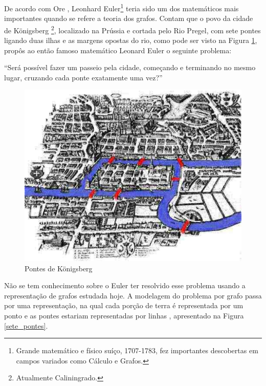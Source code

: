 De acordo com Ore \cite{Ore:1963}, Leonhard Euler\footnote{Grande matemático e físico suíço, 1707-1783, fez importantes descobertas em campos variados como Cálculo e Grafos.} teria sido um dos matemáticos mais importantes quando se refere a teoria dos grafos. Contam que o povo da cidade de Königsberg \footnote{Atualmente Caliningrado.}, localizado na Prússia e cortada pelo Rio Pregel, com sete pontes ligando duas ilhas e as margens opostas do rio, como pode ser visto na Figura \ref{Konigsberg}, propôs ao então famoso matemático Leonard Euler o seguinte problema:

	``Será possível fazer um passeio pela cidade, começando e
	terminando no mesmo lugar, cruzando cada ponte exatamente uma vez?''

\begin{figure}[!h]
	\centering
	\includegraphics[scale=0.35]{figuras/capitulo2/Konigsberg.eps}
	\caption[Pontes de Königsberg]{Pontes de Königsberg\footnotemark}
	\label{Konigsberg}
\end{figure}

Não se tem conhecimento sobre o Euler ter resolvido esse problema usando a representação de grafos estudada hoje. A modelagem do problema por grafo passa por uma representação, na qual cada porção de terra  é representada por um ponto e as pontes estariam representadas por linhas \cite{Ore:1963}, apresentado na Figura \ref{sete_pontes}.

